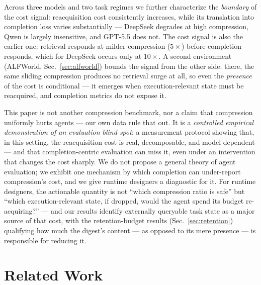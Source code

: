 \documentclass[11pt]{article}
\begin{document}
Across three models and two task regimes we further characterize the \emph{boundary} of the
cost signal: reacquisition cost consistently increases, while its translation into
completion loss varies substantially --- DeepSeek degrades at high compression, Qwen is
largely insensitive, and GPT-5.5 does not. The cost signal is also the earlier one:
retrieval responds at milder compression ($5\times$) before completion responds, which for
DeepSeek occurs only at $10\times$. A second environment (ALFWorld, Sec.~\ref{sec:alfworld}) bounds the signal from
the other side: there, the same sliding compression produces no retrieval surge at all,
so even the \emph{presence} of the cost is conditional --- it emerges when execution-relevant
state must be reacquired, and completion metrics do not expose it.

This paper is not another compression benchmark, nor a claim that compression uniformly
hurts agents --- our own data rule that out. It is a \emph{controlled empirical demonstration of
an evaluation blind spot}: a measurement protocol showing that, in this setting, the
reacquisition cost is real, decomposable, and model-dependent --- and that
completion-centric evaluation can miss it, even under an intervention that changes the
cost sharply. We do not propose a general theory of agent evaluation; we exhibit one
mechanism by which completion can under-report compression's cost, and we give runtime
designers a diagnostic for it. For runtime designers, the actionable quantity is not
``which compression ratio is safe'' but ``which execution-relevant state, if dropped, would
the agent spend its budget re-acquiring?'' --- and our results identify externally queryable
task state as a major source of that cost, with the retention-budget results
(Sec.~\ref{sec:retention}) qualifying how much the digest's content --- as opposed to its mere presence --- is
responsible for reducing it.

\section{Related Work}
\label{sec:related}
\end{document}
